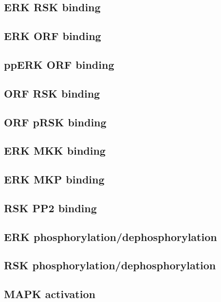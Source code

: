\documentclass[12pt]{article}
\begin{document}
	\begin{footnotesize}
		\subsection*{ERK RSK binding}
		
		\subsection*{ERK ORF binding}
		
		\subsection*{ppERK ORF binding}
		
		\subsection*{ORF RSK binding}
		
		\subsection*{ORF pRSK binding}
		
		\subsection*{ERK MKK binding}
		
		\subsection*{ERK MKP binding}
		
		\subsection*{RSK PP2 binding}
			
		\subsection*{ERK phosphorylation/dephosphorylation}
		
		\subsection*{RSK phosphorylation/dephosphorylation}
		
		\subsection*{MAPK activation}
		
	\end{footnotesize}
	
\end{document}
